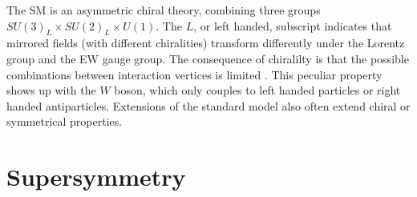 The SM is an asymmetric chiral theory, combining three groups $SU(3)_L \times SU(2)_L \times U(1)$. The $L$, or left handed, subscript indicates that mirrored fields (with different chiralities)  transform differently under the Lorentz group and the EW gauge group.  The consequence of chiralilty is that the possible combinations between interaction vertices is limited \cite{Thomson:2013zua}. This peculiar property shows up with the $W$ boson, which only couples to left handed particles or right handed antiparticles. Extensions of the standard model also often extend chiral or symmetrical properties.  %

\section{Supersymmetry}

